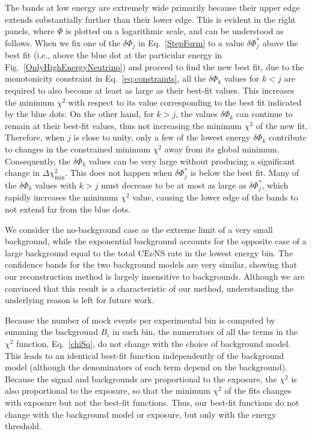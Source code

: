 \documentclass[a4paper,11pt]{article}
\renewcommand\({\left(}
\renewcommand\){\right)}
\renewcommand\[{\left[}
\renewcommand\]{\right]}
\theoremstyle{definition}
\newcommand{\CEnNS}{\text{CE}\nu\text{NS}}
\begin{document}
The bands at low energy are extremely wide primarily because their upper edge extends substantially further than their lower edge. This is evident in the 
right panels, where $\Phi$ is plotted on a logarithmic scale, and can be understood as follows. When we fix one of the $\delta\Phi_j$ in Eq.~\eqref{StepForm} to a value $\delta\Phi_j^\ast$ above the best fit (i.e., above the blue dot at the particular energy in Fig.~\ref{OnlyHighEnergyNeutrino}) and proceed to find the new best fit, due to the monotonicity constraint in Eq.~\eqref{eq:constraints}, all the $\delta\Phi_k$ values for $k<j$ are required to also become at least as large as their best-fit values. This increases the minimum $\chi^2$ with respect to its value corresponding to the best fit indicated by the blue dots.  On the other hand, for $k>j$, the values $\delta\Phi_k$ can continue to remain at their best-fit values, thus not increasing the minimum $\chi^2$ of the new fit. Therefore, when $j$ is close to unity, only a few of the lowest energy $\delta\Phi_k$ contribute to changes in the constrained minimum $\chi^2$ away from its global minimum. Consequently, the $\delta\Phi_k$ values can be very large without producing a significant change in $\Delta \chi^2_{\min}$. This does not happen when $\delta\Phi_j^\ast$ is below the best fit. Many of the $\delta\Phi_k$ values with $k>j$ must decrease to be at most as large as $\delta\Phi_j^\ast$, which rapidly increases the minimum $\chi^2$ value, causing the lower edge of the bands to not extend far from the blue dots.

We consider the no-background case as the extreme limit of a very small background, while the exponential background accounts for the opposite case of a large background equal to the total $\CEnNS$ rate in the lowest energy bin. The confidence bands for the two background models are very similar, showing that our reconstruction method is largely insensitive to backgrounds. Although we are convinced that this result is a characteristic of our method, understanding the underlying reason is left for future work.

Because the number of mock events per experimental bin is computed by summing the background $B_i$ in each bin, the numerators of all the terms in the $\chi^2$ function, Eq.~\eqref{chiSq}, do not change with the choice of background model.  This leads to an identical best-fit function independently of the background model (although the denominators of each term depend on the background). Because the signal and backgrounds are proportional to the exposure, the $\chi^2$ is also proportional to the exposure, so that the minimum $\chi^2$ of the fits changes with exposure but not the best-fit functions. Thus, our best-fit functions do not change with the background model or exposure, but only with the energy threshold.
\end{document}
